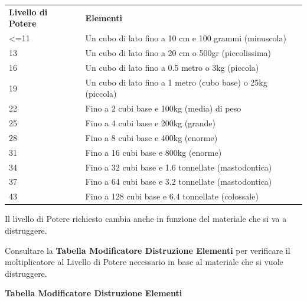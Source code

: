 \documentclass[a4paper,11pt,twoside,openany]{book}
\begin{document}
\begin{tabularx}{0.95\textwidth}{lX}
	\toprule
	\textbf{Livello di Potere} & \textbf{Elementi}\\
	\textless=11               & Un cubo di lato fino a 10 cm e 100 grammi (minuscola)\\
	13          & Un cubo di lato fino a 20 cm o 500gr (piccolissima)\\
	16          & Un cubo di lato fino a 0.5 metro o 3kg (piccola)\\
	19          & Un cubo di lato fino a 1 metro (cubo base) o 25kg (piccola)\\
	22          & Fino a 2 cubi base e 100kg (media) di peso\\
	25          & Fino a 4 cubi base e 200kg (grande)\\
	28          & Fino a 8 cubi base e 400kg (enorme)\\
	31          & Fino a 16 cubi base e 800kg (enorme)\\
	34          & Fino a 32 cubi base e 1.6 tonnellate (mastodontica)\\
	37          & Fino a 64 cubi base e 3.2 tonnellate (mastodontica)\\
	43          & Fino a 128 cubi base e 6.4 tonnellate (colossale)\\
\end{tabularx}

\bigskip

Il livello di Potere richiesto cambia anche in funzione del materiale che si va a distruggere.

\bigskip

Consultare la \textbf{Tabella Modificatore Distruzione Elementi} per verificare il moltiplicatore al Livello di Potere necessario in base al materiale che si vuole distruggere.

\bigskip

\textbf{Tabella Modificatore Distruzione Elementi}
\end{document}
